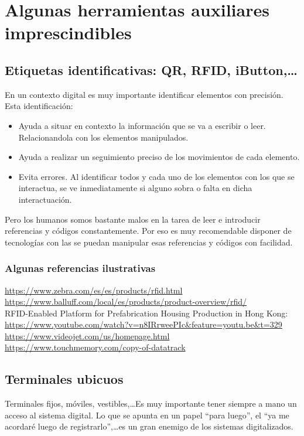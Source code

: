 \documentclass[spanish,12pt,a4paper,final,oneside]{book}
\begin{document}
\section{Algunas herramientas auxiliares imprescindibles}

\subsection{Etiquetas identificativas: QR, RFID, iButton,\ldots}
En un contexto digital es muy importante identificar elementos con precisión. Esta identificación:
\begin{itemize}
\item Ayuda a situar en contexto la información que se va a escribir o leer. Relacionandola con los elementos manipulados.
\item Ayuda a realizar un seguimiento preciso de los movimientos de cada elemento.
\item Evita errores. Al identificar todos y cada uno de los elementos con los que se interactua, se ve inmediatamente si alguno sobra o falta en dicha interactuación.
\end{itemize}

Pero los humanos somos bastante malos en la tarea de leer e introducir referencias y códigos constantemente. Por eso es muy recomendable disponer de tecnologías con las se puedan manipular esas referencias y códigos con facilidad.

\subsubsection*{Algunas referencias ilustrativas}
\url{https://www.zebra.com/es/es/products/rfid.html}
\\ \url{https://www.balluff.com/local/es/products/product-overview/rfid/}
\\ RFID-Enabled Platform for Prefabrication Housing Production in Hong Kong: \url{https://www.youtube.com/watch?v=n8IRrweePIc&feature=youtu.be&t=329}
\\ \url{https://www.videojet.com/us/homepage.html}
\\ \url{https://www.touchmemory.com/copy-of-datatrack}
\\ \url{}


\subsection{Terminales ubicuos}
Terminales fijos, móviles, vestibles,\ldots Es muy importante tener siempre a mano un acceso al sistema digital. Lo que se apunta en un papel ``para luego'', el ``ya me acordaré luego de registrarlo'',\ldots es un gran enemigo de los sistemas digitalizados.
\end{document}
